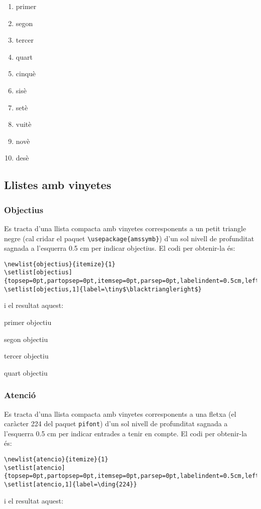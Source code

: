 \documentclass[a4paper,%
                             twoside,%
                             BCOR1.0cm,%
                             DIV11,%
                             parskip=full,%
                             11pt]{scrbook}
\begin{document}

\begin{enumerate}[nolistsep,label=\ding{\value{enumi}},start=202]
\item  primer
\item segon
\item tercer
\item quart
\item cinquè
\item sisè
\item setè
\item vuitè
\item novè
\item desè
\end{enumerate}

\subsection{Llistes amb vinyetes}\label{sbsec:llistpics}
\subsubsection{Objectius}\label{ssbsec:objs}
Es tracta d'una llista compacta amb vinyetes corresponents a un petit triangle negre (cal cridar el paquet \verb+\usepackage{amssymb}+) d'un sol nivell de profunditat  sagnada a l'esquerra 0.5 cm per indicar objectius. El codi per obtenir-la és:
\begin{tiny}
\begin{verbatim}
\newlist{objectius}{itemize}{1}
\setlist[objectius]{topsep=0pt,partopsep=0pt,itemsep=0pt,parsep=0pt,labelindent=0.5cm,leftmargin=*}
\setlist[objectius,1]{label=\tiny$\blacktriangleright$}
\end{verbatim}
\end{tiny}
i el resultat aquest:

\begin{objectius}
\item  primer objectiu
\item segon objectiu
\item tercer objectiu
\item quart objectiu
\end{objectius}

\subsubsection{Atenció}\label{ssbsec:at}
Es tracta d'una llista compacta amb vinyetes corresponents a una fletxa (el caràcter 224 del paquet \verb+pifont+) d'un sol nivell de profunditat  sagnada a l'esquerra 0.5 cm per indicar entrades a tenir en compte. El codi per obtenir-la és:
\begin{tiny}
\begin{verbatim}
\newlist{atencio}{itemize}{1}
\setlist[atencio]{topsep=0pt,partopsep=0pt,itemsep=0pt,parsep=0pt,labelindent=0.5cm,leftmargin=*}
\setlist[atencio,1]{label=\ding{224}}
\end{verbatim}
\end{tiny}
i el resultat aquest:
\end{document}
